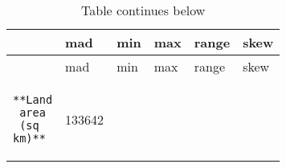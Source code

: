 \documentclass[
]{article}
\begin{document}
\begin{longtable}[]{@{}llllll@{}}
\caption{Table continues below}\tabularnewline
\toprule
\begin{minipage}[b]{0.20\columnwidth}\raggedright
~\strut
\end{minipage} & \begin{minipage}[b]{0.12\columnwidth}\raggedright
mad\strut
\end{minipage} & \begin{minipage}[b]{0.14\columnwidth}\raggedright
min\strut
\end{minipage} & \begin{minipage}[b]{0.13\columnwidth}\raggedright
max\strut
\end{minipage} & \begin{minipage}[b]{0.13\columnwidth}\raggedright
range\strut
\end{minipage} & \begin{minipage}[b]{0.13\columnwidth}\raggedright
skew\strut
\end{minipage}\tabularnewline
\midrule
\endfirsthead
\toprule
\begin{minipage}[b]{0.20\columnwidth}\raggedright
~\strut
\end{minipage} & \begin{minipage}[b]{0.12\columnwidth}\raggedright
mad\strut
\end{minipage} & \begin{minipage}[b]{0.14\columnwidth}\raggedright
min\strut
\end{minipage} & \begin{minipage}[b]{0.13\columnwidth}\raggedright
max\strut
\end{minipage} & \begin{minipage}[b]{0.13\columnwidth}\raggedright
range\strut
\end{minipage} & \begin{minipage}[b]{0.13\columnwidth}\raggedright
skew\strut
\end{minipage}\tabularnewline
\midrule
\endhead
\begin{minipage}[t]{0.20\columnwidth}\raggedright
\begin{verbatim}
**Land
 area
 (sq
km)**
\end{verbatim}
\strut
\end{minipage} & \begin{minipage}[t]{0.12\columnwidth}\raggedright
133642\strut
\end{minipage} & \begin{minipage}[t]{0.14\columnwidth}\raggedright

\end{minipage}
\end{longtable}
\end{document}
